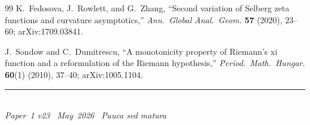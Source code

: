 \documentclass[11pt]{article}
\begin{document}
\begin{thebibliography}{99}
K.~Fedosova, J.~Rowlett, and G.~Zhang,
``Second variation of Selberg zeta functions and
curvature asymptotics,''
\emph{Ann.\ Global Anal.\ Geom.} \textbf{57} (2020),
23--60; arXiv:1709.03841.

J.~Sondow and C.~Dumitrescu,
``A monotonicity property of Riemann's xi function
and a reformulation of the Riemann hypothesis,''
\emph{Period.\ Math.\ Hungar.} \textbf{60}(1) (2010),
37--40; arXiv:1005.1104.

\end{thebibliography}

\enlargethispage{3\baselineskip}
\vspace*{\fill}
\begin{minipage}{\linewidth}
\rule{\linewidth}{0.4pt}\smallskip\\
\small\emph{Paper~1 v23 \textperiodcentered\ May~2026
\textperiodcentered\ Pauca sed matura}
\end{minipage}
\end{document}
